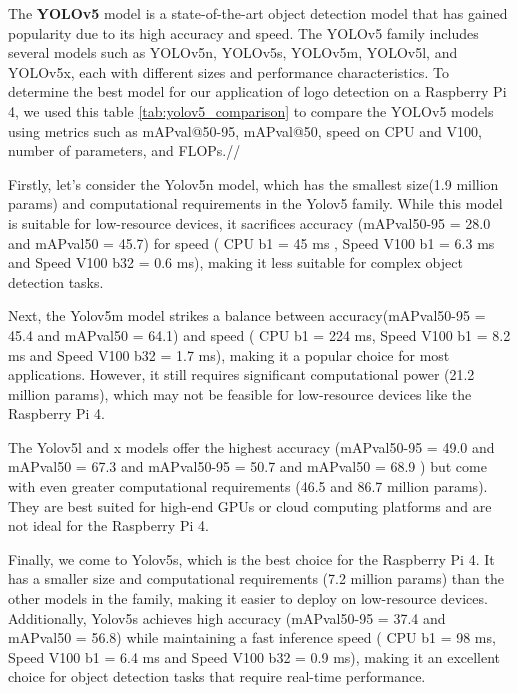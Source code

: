 \begin{itemize}

\FloatBarrier

The \textbf{YOLOv5} model is a state-of-the-art object detection model that has gained popularity due to its high accuracy and speed. The YOLOv5 family includes several models such as YOLOv5n, YOLOv5s, YOLOv5m, YOLOv5l, and YOLOv5x, each with different sizes and performance characteristics. To determine the best model for our application of logo detection on a Raspberry Pi 4, we used this table \ref{tab:yolov5_comparison} to compare the YOLOv5 models using metrics such as mAPval@50-95, mAPval@50, speed on CPU and V100, number of parameters, and FLOPs.//

Firstly, let's consider the Yolov5n model, which has the smallest size(1.9 million params) and computational requirements in the Yolov5 family. While this model is suitable for low-resource devices, it sacrifices accuracy (mAPval50-95 = 28.0 and mAPval50 =  45.7) for speed ( CPU b1 = 45 ms  , Speed V100 b1 = 6.3 ms and Speed V100 b32 = 	0.6 ms), making it less suitable for complex object detection tasks.

Next, the Yolov5m model strikes a balance between accuracy(mAPval50-95 = 45.4 and mAPval50 =  64.1) and speed ( CPU b1 = 224 ms, Speed V100 b1 = 8.2 ms and Speed V100 b32 = 1.7 ms), making it a popular choice for most applications. However, it still requires significant computational power (21.2 million params), which may not be feasible for low-resource devices like the Raspberry Pi 4.

The Yolov5l and x models offer the highest accuracy (mAPval50-95 = 49.0 and mAPval50 =  67.3 and mAPval50-95 = 50.7 and mAPval50 =  68.9 ) but come with even greater computational requirements (46.5 and 86.7 million params). They are best suited for high-end GPUs or cloud computing platforms and are not ideal for the Raspberry Pi 4.

Finally, we come to Yolov5s, which is the best choice for the Raspberry Pi 4. It has a smaller size and computational requirements (7.2 million params) than the other models in the family, making it easier to deploy on low-resource devices. Additionally, Yolov5s achieves high accuracy (mAPval50-95 = 37.4 and mAPval50 =  56.8) while maintaining a fast inference speed ( CPU b1 = 98 ms, Speed V100 b1 = 6.4 ms and Speed V100 b32 = 0.9 ms), making it an excellent choice for object detection tasks that require real-time performance.


\end{itemize}
